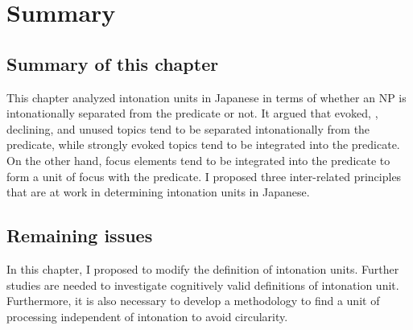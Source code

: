 \section{Summary}

\subsection{Summary of this chapter}


This chapter analyzed intonation units in Japanese
in terms of whether an NP is intonationally separated from the predicate or not.
It argued that evoked, , declining, and unused topics tend to be separated intonationally from the predicate,
while strongly evoked topics tend to be integrated into the predicate.
On the other hand,
focus elements tend to be integrated into the predicate
to form a unit of focus with the predicate.
I proposed three inter-related principles that are at work in determining
intonation units in Japanese.



\subsection{Remaining issues}

In this chapter,
I proposed to modify the definition of intonation units.
Further studies are needed to investigate cognitively valid definitions of intonation unit.
Furthermore, it is also necessary to develop a methodology to find a unit of processing independent of intonation
to avoid circularity.






